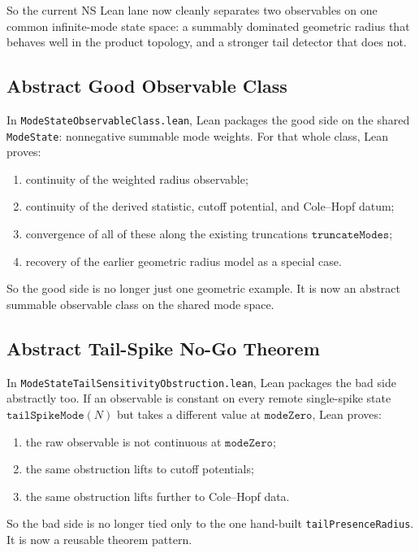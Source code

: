 \documentclass[11pt]{article}
\begin{document}
So the current NS Lean lane now cleanly separates two observables on one common
infinite-mode state space: a summably dominated geometric radius that behaves
well in the product topology, and a stronger tail detector that does not.

\subsection{Abstract Good Observable Class}

In \texttt{ModeStateObservableClass.lean}, Lean packages the good side on the
shared \texttt{ModeState}: nonnegative summable mode weights.  For that whole
class, Lean proves:
\begin{enumerate}[leftmargin=1.5em]
  \item continuity of the weighted radius observable;
  \item continuity of the derived statistic, cutoff potential, and Cole--Hopf
  datum;
  \item convergence of all of these along the existing truncations
  \(\texttt{truncateModes}\);
  \item recovery of the earlier geometric radius model as a special case.
\end{enumerate}

So the good side is no longer just one geometric example.  It is now an
abstract summable observable class on the shared mode space.

\subsection{Abstract Tail-Spike No-Go Theorem}

In \texttt{ModeStateTailSensitivityObstruction.lean}, Lean packages the bad
side abstractly too.  If an observable is constant on every remote
single-spike state \(\texttt{tailSpikeMode}(N)\) but takes a different value at
\(\texttt{modeZero}\), Lean proves:
\begin{enumerate}[leftmargin=1.5em]
  \item the raw observable is not continuous at \(\texttt{modeZero}\);
  \item the same obstruction lifts to cutoff potentials;
  \item the same obstruction lifts further to Cole--Hopf data.
\end{enumerate}

So the bad side is no longer tied only to the one hand-built
\texttt{tailPresenceRadius}.  It is now a reusable theorem pattern.
\end{document}
